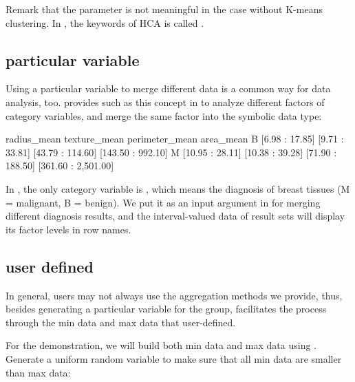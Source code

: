 \documentclass[article]{jss}
\begin{document}
Remark that the  parameter is not meaningful in the case without K-means clustering. In , the keywords of HCA is called .

\subsection{particular variable}

Using a particular variable to merge different data is a common way for data analysis, too.  provides such as this concept in  to analyze different factors of category variables, and merge the same factor into the symbolic data type:

\begin{Schunk}
\begin{Soutput}
      radius_mean    texture_mean   perimeter_mean           area_mean
B  [6.98 : 17.85]  [9.71 : 33.81] [43.79 : 114.60]   [143.50 : 992.10]
M [10.95 : 28.11] [10.38 : 39.28] [71.90 : 188.50] [361.60 : 2,501.00]
\end{Soutput}
\end{Schunk}

In , the only category variable is , which means the diagnosis of breast tissues (M = malignant, B = benign). We put it as an input argument in  for merging different diagnosis results, and the interval-valued data of result sets will display its factor levels in row names.


\subsection{user defined}\label{sec:userDef}

In general, users may not always use the aggregation methods we provide, thus, besides generating a particular variable for the group,  facilitates the process through the min data and max data that user-defined.

For the demonstration, we will build both min data and max data using . Generate a uniform random variable to make sure that all min data are smaller than max data:
\end{document}
